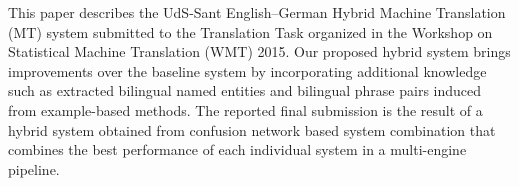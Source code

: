 This paper describes the UdS-Sant English--German Hybrid Machine Translation (MT) system submitted to the Translation Task organized in the Workshop on Statistical Machine Translation (WMT) 2015.  Our proposed hybrid system brings improvements over the baseline system by incorporating additional knowledge such as extracted bilingual named entities and bilingual phrase pairs induced from example-based methods. The reported final submission is the result of a hybrid system obtained from confusion network based system combination that combines the best performance of each individual system in a multi-engine pipeline.
